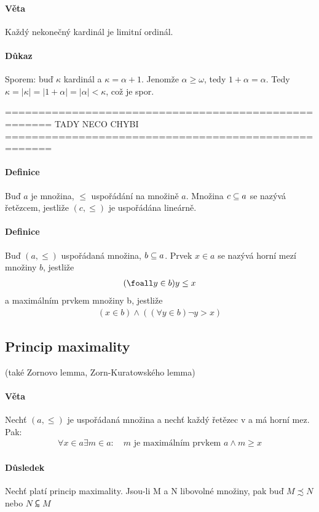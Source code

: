 \documentclass[a4paper,12pt,titlepage]{article}
\begin{document}
\begin{enumerate}
\paragraph{Věta}
Každý nekonečný kardinál je limitní ordinál.
\paragraph{Důkaz}
Sporem: buď $\kappa$ kardinál a $\kappa = \alpha + 1$. Jenomže $\alpha \ge
\omega$, tedy $1 + \alpha = \alpha$. Tedy $\kappa = |\kappa| = |1+\alpha| =
|\alpha| < \kappa$, což je spor.


=====================================================
TADY NECO CHYBI
=====================================================


\paragraph{Definice}
Buď $a$ je množina, $\le$ uspořádání na množině $a$. Množina $c \subseteq a$ se nazývá
řetězcem, jestliže $(c, \le)$ je uspořádána lineárně.
\paragraph{Definice}
Buď $(a, \le)$ uspořádaná množina, $b \subseteq a$. Prvek $x \in a$ se nazývá horní
mezí množiny $b$, jestliže 
\begin{align}
	(\foall y \in b) y \le x
\end{align}
a maximálním prvkem množiny b, jestliže
\begin{align}
	(x \in b) \land ((\forall y \in b) \neg y > x)
\end{align}

\subsection{Princip maximality}
\setcounter{equation}{0}
(také Zornovo lemma, Zorn-Kuratowského lemma)
\paragraph{Věta}
Nechť $(a, \le)$ je uspořádaná množina a nechť každý řetězec v a má horní mez.
Pak:
\begin{align}
	\forall x \in a \exists m \in a: \quad m \text{ je maximálním prvkem } a
	\land m \ge x
\end{align}
\paragraph{Důsledek}
Nechť platí princip maximality. Jsou-li M a N libovolné množiny, pak buď $M
\precsim N$
nebo $N \subsim M$

\end{enumerate}
\end{document}
